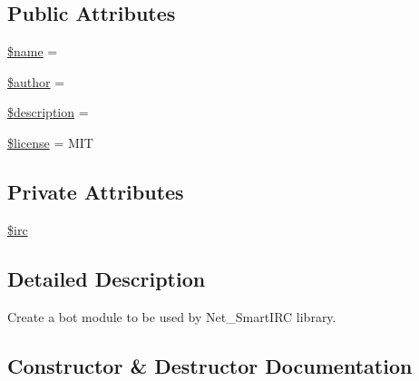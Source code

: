 \subsection*{Public Attributes}
\begin{DoxyCompactItemize}
\item 
\hyperlink{classNet__SmartIRC__module__shabri_a03db7b1894653334db45217284781a32}{\$name} = \textquotesingle{}\textquotesingle{}
\item 
\hyperlink{classNet__SmartIRC__module__shabri_a1fde51b8caf0d0cd8631c47ee16ae501}{\$author} = \textquotesingle{}\textquotesingle{}
\item 
\hyperlink{classNet__SmartIRC__module__shabri_af61d6f8235505952dbe0922ce1524412}{\$description} = \textquotesingle{}\textquotesingle{}
\item 
\hyperlink{classNet__SmartIRC__module__shabri_a08fcbcccb2c24469862e98cba1911049}{\$license} = \textquotesingle{}M\+IT\textquotesingle{}
\end{DoxyCompactItemize}
\subsection*{Private Attributes}
\begin{DoxyCompactItemize}
\item 
\hyperlink{classNet__SmartIRC__module__shabri_a6f5d61be96fc20ee5ffc8d07ccb2d578}{\$irc}
\end{DoxyCompactItemize}


\subsection{Detailed Description}
Create a bot module to be used by Net\+\_\+\+Smart\+I\+RC library. 

\subsection{Constructor \& Destructor Documentation}
